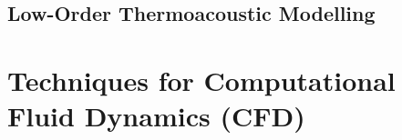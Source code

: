 \cite{emmert2015IntrinsicThermoacousticInstability}
\cite{silva2023IntrinsicThermoacousticInstabilities}
\cite{hoeijmakers2014IntrinsicInstabilityFlame}
\cite{hoeijmakers2016FlameDominatedThermoacoustic}
\cite{orchini2025TrackingAcousticIntrinsic}
\cite{chen2024BiglobalLinearStability}




\subsection{Low-Order Thermoacoustic Modelling}


\cite{juniper2018SensitivityNonlinearityThermoacoustic}




\section{Techniques for Computational Fluid Dynamics (CFD)}


\cite{orszag1970AnalyticalTheoriesTurbulence, domingo2023RecentDevelopmentsDNS, chen2011PetascaleDirectNumerical, yang2015LargeeddySimulationPresent, veynante2002TurbulentCombustionModeling, moin1998DirectNumericalSimulation, tennekes1972FirstCourseTurbulence}



